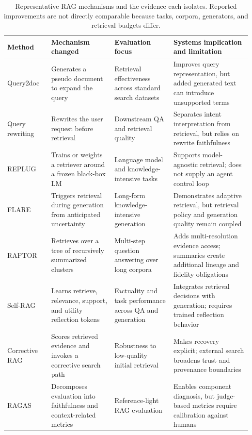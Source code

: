 \begin{table}[t]
\centering
\caption{Representative RAG mechanisms and the evidence each isolates. Reported improvements are not directly comparable because tasks, corpora, generators, and retrieval budgets differ.}
\label{tab:rag-method-evidence}
\small
\surveytableformat
\begin{tabularx}{\textwidth}{L{2.55cm}L{3.05cm}L{3.15cm}Y}
\toprule
{}\textbf{Method} & \textbf{Mechanism changed} & \textbf{Evaluation focus} & \textbf{Systems implication and limitation} \\
\midrule
Query2doc~\cite{wang2023query2doc} & Generates a pseudo document to expand the query & Retrieval effectiveness across standard search datasets & Improves query representation, but added generated text can introduce unsupported terms \\
Query rewriting~\cite{ma2023queryrewriting} & Rewrites the user request before retrieval & Downstream QA and retrieval quality & Separates intent interpretation from retrieval, but relies on rewrite faithfulness \\
REPLUG~\cite{shi2023replug} & Trains or weights a retriever around a frozen black-box LM & Language model and knowledge-intensive tasks & Supports model-agnostic retrieval; does not supply an agent control loop \\
FLARE~\cite{jiang2023flare} & Triggers retrieval during generation from anticipated uncertainty & Long-form knowledge-intensive generation & Demonstrates adaptive retrieval, but retrieval policy and generation quality remain coupled \\
RAPTOR~\cite{sarthi2024raptor} & Retrieves over a tree of recursively summarized clusters & Multi-step question answering over long corpora & Adds multi-resolution evidence access; summaries create additional lineage and fidelity obligations \\
Self-RAG~\cite{asai2024selfrag} & Learns retrieve, relevance, support, and utility reflection tokens & Factuality and task performance across QA and generation & Integrates retrieval decisions with generation; requires trained reflection behavior \\
Corrective RAG~\cite{yan2024crag} & Scores retrieved evidence and invokes a corrective search path & Robustness to low-quality initial retrieval & Makes recovery explicit; external search broadens trust and provenance boundaries \\
RAGAS~\cite{es2024ragas} & Decomposes evaluation into faithfulness and context-related metrics & Reference-light RAG evaluation & Enables component diagnosis, but judge-based metrics require calibration against humans \\
\bottomrule
\end{tabularx}
\end{table}

